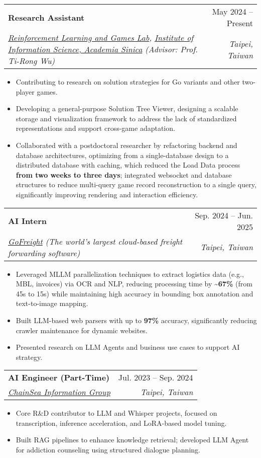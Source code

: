 \documentclass[letterpaper,10pt]{article}
\makeatletter
\newcommand{\resumeItem}[1]{
  \item\small{
    {#1 \vspace{-2pt}}
  }
}
\newcommand{\resumeSubheading}[4]{
  \vspace{-2pt}\item
    \begin{tabular*}{0.97\textwidth}[t]{l@{\extracolsep{\fill}}r}
      \textbf{#1} & #2 \\
      \textit{\small#3} & \textit{\small #4} \\
    \end{tabular*}\vspace{-7pt}
}
\newcommand{\resumeItemListStart}{\begin{itemize}}
\newcommand{\resumeItemListEnd}{\end{itemize}\vspace{-5pt}}
\makeatother
\begin{document}
    \resumeSubheading
      {Research Assistant}{May 2024 -- Present}
      {\href{https://homepage.iis.sinica.edu.tw/pages/tirongwu/index_en.html}{Reinforcement Learning and Games Lab}, \href{https://www.iis.sinica.edu.tw/en/page/AboutUs/Introduction.html}{Institute of Information Science, Academia Sinica} (Advisor: Prof. Ti-Rong Wu)}{Taipei, Taiwan}
      \resumeItemListStart
        \resumeItem{Contributing to research on solution strategies for Go variants and other two-player games.}
        \resumeItem{Developing a general-purpose Solution Tree Viewer, designing a scalable storage and visualization framework to address the lack of standardized representations and support cross-game adaptation.}
        \resumeItem{Collaborated with a postdoctoral researcher by refactoring backend and database architectures, optimizing from a single-database design to a distributed database with caching, which reduced the Load Data process \textbf{from two weeks to three days}; integrated websocket and database structures to reduce multi-query game record reconstruction to a single query, significantly improving rendering and interaction efficiency.}
      \resumeItemListEnd
    
    \resumeSubheading
      {AI Intern}{Sep. 2024 -- Jun. 2025}
      {\href{https://www.gofreight.com/}{GoFreight} (The world's largest cloud-based freight forwarding software)}{Taipei, Taiwan}
        \resumeItemListStart
          \resumeItem{Leveraged MLLM parallelization techniques to extract logistics data (e.g., MBL, invoices) via OCR and NLP, reducing processing time by \textbf{\textasciitilde67\%} (from 45s to 15s) while maintaining high accuracy in bounding box annotation and text-to-image mapping.}
          \resumeItem{Built LLM-based web parsers with up to \textbf{97\%} accuracy, significantly reducing crawler maintenance for dynamic websites.}
          \resumeItem{Presented research on LLM Agents and business use cases to support AI strategy.}
        \resumeItemListEnd

    \resumeSubheading
      {AI Engineer (Part-Time)}{Jul. 2023 -- Sep. 2024}
      {\href{https://www.chainsea.com.tw/about/introduction/}{ChainSea Information Group}}{Taipei, Taiwan}
        \resumeItemListStart
          \resumeItem{Core R\&D contributor to LLM and Whisper projects, focused on transcription, inference acceleration, and LoRA-based model tuning.}
          \resumeItem{Built RAG pipelines to enhance knowledge retrieval; developed LLM Agent for addiction counseling using structured dialogue planning.}
        \resumeItemListEnd
\end{document}
